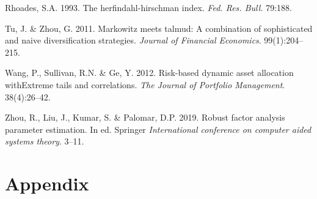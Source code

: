 \documentclass[11pt,preprint, authoryear]{elsarticle}
\numberwithin{equation}{section}
\numberwithin{figure}{section}
\numberwithin{table}{section}
\begin{document}
\leavevmode\hypertarget{ref-rhoades1993}{}%
Rhoades, S.A. 1993. The herfindahl-hirschman index. \emph{Fed. Res.
Bull.} 79:188.

\leavevmode\hypertarget{ref-tu2011}{}%
Tu, J. \& Zhou, G. 2011. Markowitz meets talmud: A combination of
sophisticated and naive diversification strategies. \emph{Journal of
Financial Economics}. 99(1):204--215.

\leavevmode\hypertarget{ref-wang2012}{}%
Wang, P., Sullivan, R.N. \& Ge, Y. 2012. Risk-based dynamic asset
allocation withExtreme tails and correlations. \emph{The Journal of
Portfolio Management}. 38(4):26--42.

\leavevmode\hypertarget{ref-zhou2019}{}%
Zhou, R., Liu, J., Kumar, S. \& Palomar, D.P. 2019. Robust factor
analysis parameter estimation. In ed. Springer \emph{International
conference on computer aided systems theory}. 3--11.

\newpage

\hypertarget{appendix}{%
\section*{Appendix}\label{appendix}}
\end{document}
